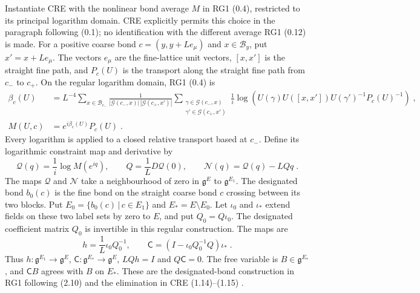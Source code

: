 \documentclass[11pt]{article}
\begin{document}
Instantiate CRE with the nonlinear bond average $M$ in RG1 (0.4), restricted to its principal logarithm domain. CRE explicitly permits this choice in the paragraph following (0.1); no identification with the different average RG1 (0.12) is made. For a positive coarse bond $c=(y,y+Le_\mu)$ and $x\in\mathcal B_y$, put $x'=x+Le_\mu$. The vectors $e_\mu$ are the fine-lattice unit vectors, $[x,x']$ is the straight fine path, and $P_c(U)$ is the transport along the straight fine path from $c_-$ to $c_+$. On the regular logarithm domain, RG1 (0.4) is
\begin{equation}\label{eq:nonlinear-average}
    \begin{aligned}
        \beta_c(U)&=L^{-4}\sum_{x\in \mathcal B_{c_-}}
            \frac{1}{|\mathcal G(c_-,x)|\,|\mathcal G(c_+,x')|}
            \sum_{\substack{\gamma\in \mathcal G(c_-,x)\\
                \gamma'\in \mathcal G(c_+,x')}}
            \frac{1}{i}\log\left(
                U(\gamma)U([x,x'])U(\gamma')^{-1}P_c(U)^{-1}
                \right)\;,\\
        M(U,c)&=e^{i\beta_c(U)}P_c(U)\;.
    \end{aligned}
\end{equation}
Every logarithm is applied to a closed relative transport based at $c_-$. Define its logarithmic constraint map and derivative by
\begin{equation}\label{eq:constraint-primitive}
    \mathcal Q(q)=\frac{1}{i}\log M(e^{iq}),
    \qquad Q=\frac{1}{L}D\mathcal Q(0),
    \qquad \mathcal N(q)=\mathcal Q(q)-LQq\;.
\end{equation}
The maps $\mathcal Q$ and $\mathcal N$ take a neighbourhood of zero in $\mathfrak g^E$ to $\mathfrak g^{E_1}$. The designated bond $b_0(c)$ is the fine bond on the straight coarse bond $c$ crossing between its two blocks. Put $E_0=\{b_0(c)\, | \,c\in E_1\}$ and $E_*=E\setminus E_0$. Let $\iota_0$ and $\iota_*$ extend fields on these two label sets by zero to $E$, and put $Q_0=Q\iota_0$. The designated coefficient matrix $Q_0$ is invertible in this regular construction. The maps are
\begin{equation}\label{eq:constraint-extension}
    h=\frac{1}{L}\iota_0Q_0^{-1},
    \qquad
    \mathsf C=(I-\iota_0Q_0^{-1}Q)\iota_*\;.
\end{equation}
Thus $h \colon \mathfrak g^{E_1}\to\mathfrak g^E$, $\mathsf C \colon \mathfrak g^{E_*}\to\mathfrak g^E$, $LQh=I$ and $Q\mathsf C=0$. The free variable is $B\in\mathfrak g^{E_*}$, and $\mathsf C B$ agrees with $B$ on $E_*$. These are the designated-bond construction in RG1 following (2.10) and the elimination in CRE (1.14)--(1.15) \cite{BalabanCRE,BalabanRG1}.
\end{document}
